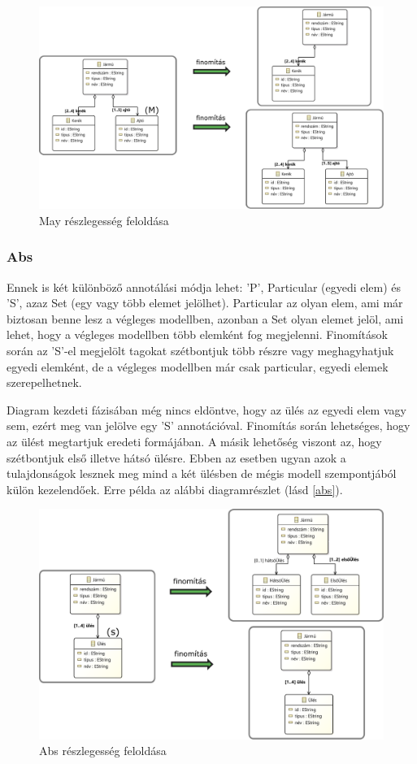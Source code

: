 \begin{figure}[htp]
	\centering
	\includegraphics[width=130mm]{figures/may.pdf}
	\caption{May részlegesség feloldása} 
	\label{may}
\end{figure}

\subsubsection{Abs}
Ennek is két különböző annotálási módja lehet: \textsf{’P’}, Particular (egyedi elem) és \textsf{’S’}, azaz Set (egy vagy több elemet jelölhet). Particular az olyan elem, ami már biztosan benne lesz a végleges modellben, azonban a Set olyan elemet jelöl, ami lehet, hogy a végleges modellben több elemként fog megjelenni. Finomítások során az \textsf{’S’}-el megjelölt tagokat szétbontjuk több részre vagy meghagyhatjuk egyedi elemként, de a végleges modellben már csak particular, egyedi elemek szerepelhetnek.
\par
Diagram kezdeti fázisában még nincs eldöntve, hogy az ülés az egyedi elem vagy sem, ezért meg van jelölve egy \textsf{’S’} annotációval. Finomítás során lehetséges, hogy az ülést megtartjuk eredeti formájában. A másik lehetőség viszont az, hogy szétbontjuk első illetve hátsó ülésre. Ebben az esetben ugyan azok a tulajdonságok lesznek meg mind a két ülésben de mégis modell szempontjából külön kezelendőek. Erre példa az alábbi diagramrészlet (lásd \autoref{abs}).

\begin{figure}[htp]
	\centering
	\includegraphics[width=130mm, keepaspectratio]{figures/abs.pdf}
	\caption{Abs részlegesség feloldása} 
	\label{abs}
\end{figure}

